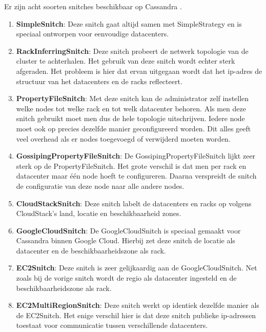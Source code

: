 Er zijn acht soorten snitches beschikbaar op Cassandra \citep{strickland2014availability}.

\begin{enumerate}
	\item \textbf{SimpleSnitch}:
	Deze snitch gaat altijd samen met SimpleStrategy en is speciaal ontworpen voor eenvoudige datacenters.
	
	\item \textbf{RackInferringSnitch}:
	Deze snitch probeert de netwerk topologie van de cluster te achterhalen.
	Het gebruik van deze snitch wordt echter sterk afgeraden.
	Het probleem is hier dat ervan uitgegaan wordt dat het ip-adres de structuur van het datacenters en de racks reflecteert.
	
	\item \textbf{PropertyFileSnitch}:
	Met deze snitch kan de administrator zelf instellen welke nodes tot welke rack en tot welk datacenter behoren.
	Als men deze snitch gebruikt moet men dus de hele topologie uitschrijven. 
	Iedere node moet ook op precies dezelfde manier geconfigureerd worden.
	Dit alles geeft veel overhead als er nodes toegevoegd of verwijderd moeten worden.
	
	\item \textbf{GossipingPropertyFileSnitch}:
	De GossipingPropertyFileSnitch lijkt zeer sterk op de PropertyFileSnitch.
	Het grote verschil is dat men per rack en datacenter maar één node hoeft te configureren.
	Daarna verspreidt de snitch de configuratie van deze node naar alle andere nodes.
	
	\item \textbf{CloudStackSnitch}:
	Deze snitch labelt de datacenters en racks op volgens CloudStack's land, locatie en beschikbaarheid zones.
	
	\item \textbf{GoogleCloudSnitch}:
	De GoogleCloudSnitch is speciaal gemaakt voor Cassandra binnen Google Cloud.
	Hierbij zet deze snitch de locatie als datacenter en de beschikbaarheidszone als rack.
	
	\item \textbf{EC2Snitch}:
	Deze snitch is zeer gelijkaardig aan de GoogleCloudSnitch.
	Net zoals bij de vorige snitch wordt de regio als datacenter ingesteld en de beschikbaarheidszone als rack.
	
	\item \textbf{EC2MultiRegionSnitch}:
	Deze snitch werkt op identiek dezelfde manier als de EC2Snitch.
	Het enige verschil hier is dat deze snitch publieke ip-adressen toestaat voor communicatie tussen verschillende datacenters.
	
\end{enumerate}

